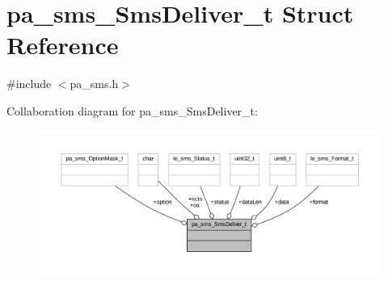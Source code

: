 \hypertarget{structpa__sms___sms_deliver__t}{}\section{pa\+\_\+sms\+\_\+\+Sms\+Deliver\+\_\+t Struct Reference}
\label{structpa__sms___sms_deliver__t}


{\ttfamily \#include $<$pa\+\_\+sms.\+h$>$}



Collaboration diagram for pa\+\_\+sms\+\_\+\+Sms\+Deliver\+\_\+t\+:
\nopagebreak
\begin{figure}[H]
\begin{center}
\leavevmode
\includegraphics[width=350pt]{structpa__sms___sms_deliver__t__coll__graph}
\end{center}
\end{figure}
